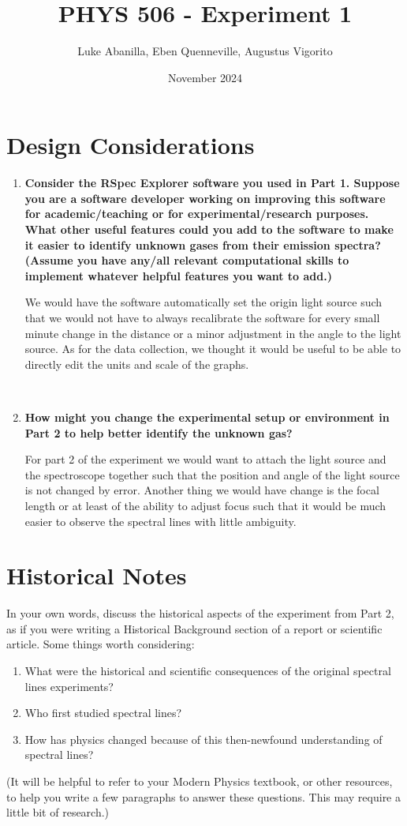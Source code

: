\documentclass{article}
\title{PHYS 506 - Experiment 1}
\author{Luke Abanilla, Eben Quenneville, Augustus Vigorito}
\date{November 2024}
\begin{document}
\maketitle

\section{Design Considerations}

\begin{enumerate}[label=(\alph*)]
    \item \textbf{Consider the RSpec Explorer software you used in Part 1. Suppose you are a software
developer working on improving this software for academic/teaching or for experimental/research purposes. What other useful features could you add to the software to
make it easier to identify unknown gases from their emission spectra? (Assume you
have any/all relevant computational skills to implement whatever helpful features you
want to add.)}

We would have the software automatically set the origin light source such that we would not have to always recalibrate the software for every small minute change in the distance or a minor adjustment in the angle to the light source. As for the data collection, we thought it would be useful to be able to directly edit the units and scale of the graphs.

\

    \item \textbf{How might you change the experimental setup or environment in Part 2 to help better
identify the unknown gas?}


For part 2 of the experiment we would want to attach the light source and the spectroscope together such that the position and angle of the light source is not changed by error. Another thing we would have change is the focal length or at least of the ability to adjust focus such that it would be much easier to observe the spectral lines with little ambiguity.

\end{enumerate}

\pagebreak

\section{Historical Notes}

In your own words, discuss the historical aspects of the experiment from Part 2, as if you
were writing a Historical Background section of a report or scientific article.
Some things worth considering:
\begin{enumerate}
    \item What were the historical and scientific consequences of the original spectral lines experiments?
    \item Who first studied spectral lines?
    \item How has physics changed because of this then-newfound understanding of spectral lines?
\end{enumerate}
(It will be helpful to refer to your Modern Physics textbook, or other resources, to help you
write a few paragraphs to answer these questions. This may require a little bit of research.)
\end{document}
